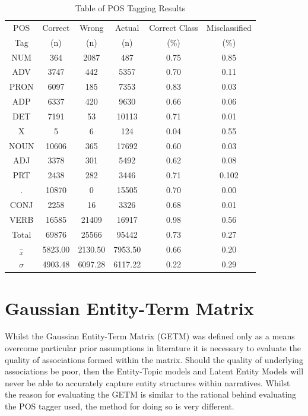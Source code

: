 \documentclass[10pt]{report}
\begin{document}
\renewcommand{\baselinestretch}{1.0}\normalsize
\renewcommand{\arraystretch}{1.2}
\begin{table}[h!]
  \centering
  \begin{tabular}{c | c | c | c || c | c }
  POS &	Correct &	Wrong &	Actual&	 Correct Class&Misclassified\\
  Tag & (n)&(n)&(n)&(\%)&(\%)  
  \\\hline
    NUM    &364   &	2087&	487&	0.75&	0.85
    \\ADV  &3747  &	442&	5357&	0.70&	0.11
    \\PRON &6097  &	185&	7353&	0.83&	0.03
    \\ADP  &6337  &	420&	9630&	0.66&	0.06
    \\DET  &7191  &	53&	10113&	0.71&	0.01
    \\X    &5     &	6&	124&	0.04&	0.55
    \\NOUN &10606 &	365&	17692&	0.60&	0.03
    \\ADJ  &3378  &	301&	5492&	0.62&	0.08
    \\PRT  &2438  &	282&	3446&	0.71&	0.102
    \\.    &10870 &	0&	15505&	0.70&	0.00
    \\CONJ &2258  &	16&	3326&	0.68&	0.01
    \\VERB &16585 &	21409&	16917&	0.98&	0.56
  \\\hline\hline
    Total &69876 &	25566   &95442&	0.73&	0.27
  \\$\over{x}$	 &      5823.00	&2130.50	&7953.50	&0.66	&0.20
  \\$\sigma$	 &      4903.48	&6097.28	&6117.22	&0.22	&0.29
\end{tabular}
\caption{ Table of POS Tagging Results\label{tab:pos_results}}
\end{table}
\renewcommand{\baselinestretch}{2.0}\normalsize
\renewcommand{\arraystretch}{1.0}

\clearpage
\section{Gaussian Entity-Term Matrix}
Whilst the Gaussian Entity-Term Matrix (GETM) was defined only as a means overcome particular prior assumptions in literature it is necessary to evaluate the quality of associations formed within the matrix. Should the quality of underlying associations be poor, then the Entity-Topic models and Latent Entity Models will never be able to accurately capture entity structures within narratives. Whilst the reason for evaluating the GETM is similar to the rational behind evaluating the POS tagger used, the method for doing so is very different.
\end{document}
